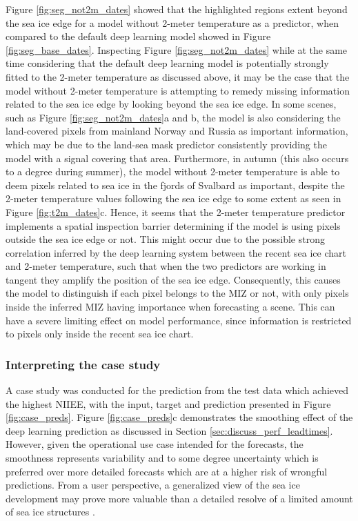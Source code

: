 \documentclass[../main/thesis]{subfiles}
\begin{document}
Figure \ref{fig:seg_not2m_dates} showed that the highlighted regions extent beyond the sea ice edge for a model without 2-meter temperature as a predictor, when compared to the default deep learning model showed in Figure \ref{fig:seg_base_dates}. Inspecting Figure \ref{fig:seg_not2m_dates} while at the same time considering that the default deep learning model is potentially strongly fitted to the 2-meter temperature as discussed above, it may be the case that the model without 2-meter temperature is attempting to remedy missing information related to the sea ice edge by looking beyond the sea ice edge. In some scenes, such as Figure \ref{fig:seg_not2m_dates}a and b, the model is also considering the land-covered pixels from mainland Norway and Russia as important information, which may be due to the land-sea mask predictor consistently providing the model with a signal covering that area. Furthermore, in autumn (this also occurs to a degree during summer), the model without 2-meter temperature is able to deem pixels related to sea ice in the fjords of Svalbard as important, despite the 2-meter temperature values following the sea ice edge to some extent as seen in Figure \ref{fig:t2m_dates}c. Hence, it seems that the 2-meter temperature predictor implements a spatial inspection barrier determining if the model is using pixels outside the sea ice edge or not. This might occur due to the possible strong correlation inferred by the deep learning system between the recent sea ice chart and 2-meter temperature, such that when the two predictors are working in tangent they amplify the position of the sea ice edge. Consequently, this causes the model to distinguish if each pixel belongs to the MIZ or not, with only pixels inside the inferred MIZ having importance when forecasting a scene. This can have a severe limiting effect on model performance, since information is restricted to pixels only inside the recent sea ice chart.

\subsubsection{Interpreting the case study}
A case study was conducted for the prediction from the test data which achieved the highest NIIEE, with the input, target and prediction presented in Figure \ref{fig:case_preds}. Figure \ref{fig:case_preds}c demonstrates the smoothing effect of the deep learning prediction as discussed in Section \ref{sec:discuss_perf_leadtimes}. However, given the operational use case intended for the forecasts, the smoothness represents variability and to some degree uncertainty which is preferred over more detailed forecasts which are at a higher risk of wrongful predictions. From a user perspective, a generalized view of the sea ice development may prove more valuable than a detailed resolve of a limited amount of sea ice structures \citep{Murphy1993}.
\end{document}
